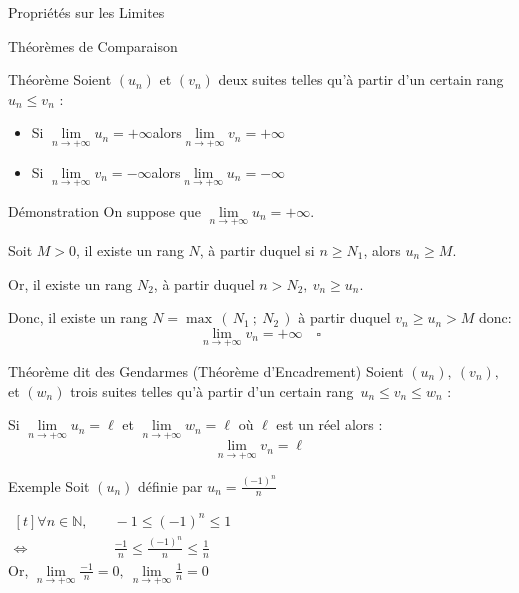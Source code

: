 \documentclass{coursbook}
\begin{document}
    \begin{Gpartie}{Propriétés sur les Limites} 
        \begin{Spartie}{Théorèmes de Comparaison} 
            \begin{SSpartie}{Théorème} 
                Soient $(u_n)$ et $(v_n)$ deux suites telles qu'à partir d'un certain rang $u_n\leq v_n$ :
                \begin{itemize}
                    \setlength\itemsep{0.5em}
                    \item Si $\lim\limits_{n\to +\infty}u_n=+\infty$\quad alors\quad $\lim\limits_{n\to +\infty}v_n=+\infty$
                    \item Si $\lim\limits_{n\to +\infty}v_n=-\infty$\quad alors\quad $\lim\limits_{n\to +\infty}u_n=-\infty$
                \end{itemize}
            \end{SSpartie}
            \begin{SSpartie}{Démonstration} 
                On suppose que $\lim\limits_{n\to +\infty}u_n=+\infty$.

                Soit $M>0$, il existe un rang $N$, à partir duquel si $n\geq N_1$, alors $u_n\geq M$.

                Or, il existe un rang $N_2$, à partir duquel $n>N_2,\ v_n\geq u_n$.

                Donc, il existe un rang $N=\max\,(\,N_1~;~N_2\,)$ à partir duquel $v_n\geq u_n>M$ donc: \[\lim\limits_{n\to +\infty}v_n=+\infty\quad\square\]
            \end{SSpartie}
            \begin{SSpartie}{Théorème dit \og des Gendarmes \fg{} (Théorème d'Encadrement)}
                Soient $(u_n),\ (v_n),$ et $(w_n)$ trois suites telles qu'à partir d'un certain rang~$u_n\leq v_n\leq w_n$ :

                Si $\lim\limits_{n\to +\infty}u_n=\ell$ et $\lim\limits_{n\to +\infty}w_n=\ell$ où $\ell$ est un réel alors :
                \[\lim\limits_{n\to +\infty}v_n=\ell\]
            \end{SSpartie}
            \begin{SSpartie}{Exemple} 
                Soit $(u_n)$ définie par $u_n=\frac{(-1)^n}{n}$

                $\begin{aligned}[t]
                    \forall n\in\mathbb{N},&\quad-1\leq (-1)^n\leq 1 \\
                    \iff&\quad\frac{-1}{n}\leq\frac{(-1)^n}{n}\leq\frac{1}{n}
                \end{aligned}$ \\[2ex]
                Or, $\lim\limits_{n\to +\infty}\frac{-1}{n}=0,\ \lim\limits_{n\to +\infty}\frac{1}{n}=0$


\end{SSpartie}
\end{Spartie}
\end{Gpartie}
\end{document}
